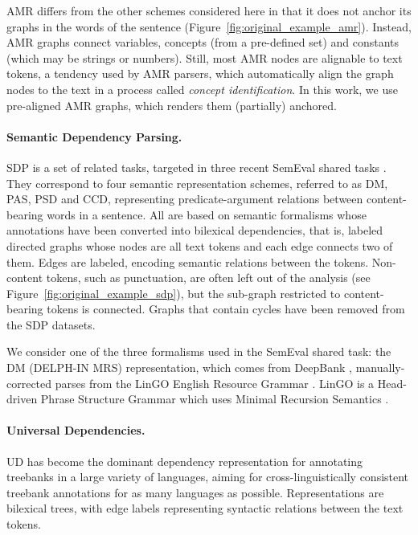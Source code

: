 \documentclass[11pt,a4paper]{article}
\begin{document}
AMR differs from the other schemes considered here in that it does not anchor its graphs
in the words of the sentence (Figure~\ref{fig:original_example_amr}). Instead, AMR graphs
connect variables, concepts (from a pre-defined set) and constants (which may be strings or numbers).
Still, most AMR nodes are alignable to text tokens, a tendency used by AMR parsers,
which automatically align the graph nodes to the text in a process called \textit{concept identification}.
In this work, we use pre-aligned AMR graphs, which renders them (partially) anchored.


\paragraph{Semantic Dependency Parsing.}\label{sec:sdp}

SDP is a set of related tasks, targeted in three recent SemEval shared tasks 
\cite{oepen2014semeval,oepen2015semeval,oepen2016towards}.
They correspond to four semantic representation schemes, referred to as
DM, PAS, PSD and CCD, representing
predicate-argument relations between content-bearing words in a sentence.
All are based on semantic formalisms whose annotations have been
converted into bilexical dependencies, that is,
labeled directed graphs whose nodes are all text tokens and each edge connects two of them.
Edges are labeled, encoding semantic relations between the tokens.
Non-content tokens, such as punctuation,
are often left out of the analysis (see Figure~\ref{fig:original_example_sdp}),
but the sub-graph restricted to content-bearing tokens is connected.
Graphs that contain cycles have been removed from the SDP datasets.

We consider one of the three formalisms used in the SemEval shared task:
the DM (DELPH-IN MRS) representation, which comes
from DeepBank \cite{flickinger2012deepbank},
manually-corrected parses from the LinGO
English Resource Grammar \cite{copestake2000open}.
LinGO is a Head-driven Phrase
Structure Grammar \cite[HPSG; ][]{pollard1994head}
which uses Minimal Recursion Semantics \cite{copestake2005minimal}.

\paragraph{Universal Dependencies.}\label{sec:ud}

UD \cite{nivre2016universal,11234/1-2515} has become
the dominant dependency representation for
annotating treebanks in a large variety of languages,
aiming for cross-linguistically consistent treebank
annotations for as many languages as possible.
Representations are bilexical trees, with edge labels representing
syntactic relations between the text tokens.
\end{document}
